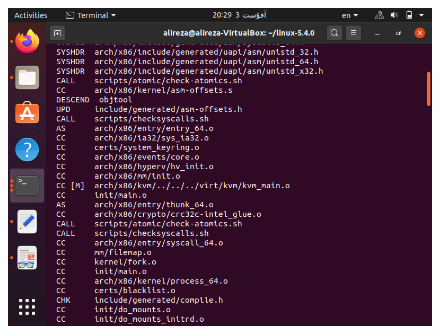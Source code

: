\begin{itemize}
\begin{enumerate}
 		 \begin{figure}[!hpbt]
 		 	\centering
 		 	\includegraphics[scale=0.4]{img/pic12.png}
 		 	

\end{figure}
\end{enumerate}
\end{itemize}
